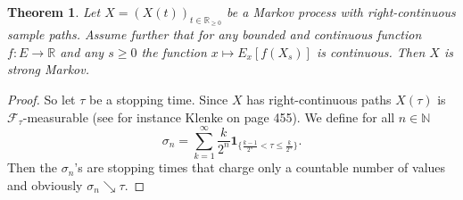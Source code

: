 \documentclass[12pt,a4paper]{scrartcl}
\newtheorem{theorem}{Theorem}[section]
\numberwithin{equation}{section}
\newcommand{\R}{\mathbb{R}} %
\newcommand{\N}{\mathbb{N}} %
\begin{document}
\begin{theorem} \label{th:MarkovJumpStrongMarkov}
Let $X= \left(X\left(t\right)\right)_{t \in \R_{\geq 0}}$ be a Markov process with right-continuous sample paths. Assume further that for any bounded and continuous function $f:E \to \R$ and any $s \geq 0$ the function $x \mapsto E_x\left[ f\left(X_s\right) \right]$ is continuous. Then $X$ is strong Markov.
\end{theorem}
\begin{proof}
So let $\tau$ be a stopping time. Since $X$ has right-continuous paths $X\left(\tau\right)$ is $\mathcal{F}_{\tau}$-measurable (see for instance Klenke \cite{klenke} on page 455). We define for all $n \in \N$
$$ \sigma_n = \sum_{k=1}^{\infty} \frac{k}{2^n} \textbf{1}_{\lbrace \frac{k-1}{2^n} < \tau \leq \frac{k}{2^n} \rbrace}. $$
Then the $\sigma_n$'s are stopping times that charge only a countable number of values and obviously $\sigma_n \searrow \tau.$ 


\end{proof}
\end{document}
